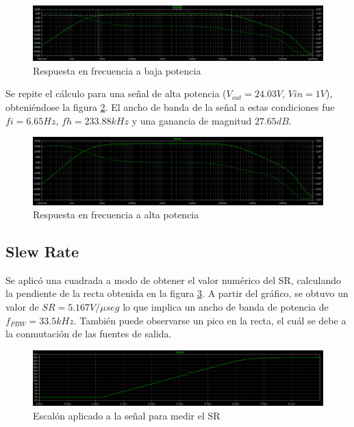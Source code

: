 \begin{figure}[H]
        \centering
        \includegraphics[scale=0.5]{./Rta_frec_baja_potencia.png}
        \caption{Respuesta en frecuencia a baja potencia}
        \label{fig::Rta_frec_baja_potencia}
\end{figure}

\par Se repite el cálculo para una señal de alta potencia ($V_{out} = 24.03V$, $Vin = 1V$), obteniéndose la figura \ref{fig::Rta_frec}. El ancho de banda de la señal a estas condiciones fue $fi = 6.65Hz$, $fh = 233.88kHz$ y una ganancia de magnitud $27.65dB$.

\begin{figure}[H]
        \centering
        \includegraphics[scale=0.5]{./Rta_frec.png}
        \caption{Respuesta en frecuencia a alta potencia}
        \label{fig::Rta_frec}
\end{figure}

\subsection{Slew Rate}



\par Se aplicó una cuadrada a modo de obtener el valor numérico del SR, calculando la pendiente de la recta obtenida en la figura \ref{fig::Slew_rate_escalon}. A partir del gráfico, se obtuvo un valor de $SR = 5.167 V /\mu seg$ lo que implica un ancho de banda de potencia de $f_{PBW} = 33.5kHz$. También puede observarse un pico en la recta, el cuál se debe a la conmutación de las fuentes de salida.

\begin{figure}[H]
        \centering
        \includegraphics[scale=0.5]{./Slew_rate_escalon.png}
        \caption{Escalón aplicado a la señal para medir el SR}
        \label{fig::Slew_rate_escalon}
\end{figure}


